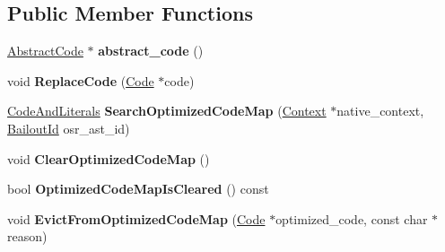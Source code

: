 \subsection*{Public Member Functions}
\begin{DoxyCompactItemize}
\item 
\hyperlink{classv8_1_1internal_1_1_abstract_code}{Abstract\+Code} $\ast$ {\bfseries abstract\+\_\+code} ()\hypertarget{classv8_1_1internal_1_1_shared_function_info_a795992850941caac037a2a79b6725e74}{}\label{classv8_1_1internal_1_1_shared_function_info_a795992850941caac037a2a79b6725e74}

\item 
void {\bfseries Replace\+Code} (\hyperlink{classv8_1_1internal_1_1_code}{Code} $\ast$code)\hypertarget{classv8_1_1internal_1_1_shared_function_info_aabebd159b454298b0c39320cf24c13ff}{}\label{classv8_1_1internal_1_1_shared_function_info_aabebd159b454298b0c39320cf24c13ff}

\item 
\hyperlink{structv8_1_1internal_1_1_code_and_literals}{Code\+And\+Literals} {\bfseries Search\+Optimized\+Code\+Map} (\hyperlink{classv8_1_1internal_1_1_context}{Context} $\ast$native\+\_\+context, \hyperlink{classv8_1_1internal_1_1_bailout_id}{Bailout\+Id} osr\+\_\+ast\+\_\+id)\hypertarget{classv8_1_1internal_1_1_shared_function_info_ac9d57a16aca72f42051fd6ec5205c04a}{}\label{classv8_1_1internal_1_1_shared_function_info_ac9d57a16aca72f42051fd6ec5205c04a}

\item 
void {\bfseries Clear\+Optimized\+Code\+Map} ()\hypertarget{classv8_1_1internal_1_1_shared_function_info_ad5fadaa94b7cf7af93630aeca427ba35}{}\label{classv8_1_1internal_1_1_shared_function_info_ad5fadaa94b7cf7af93630aeca427ba35}

\item 
bool {\bfseries Optimized\+Code\+Map\+Is\+Cleared} () const \hypertarget{classv8_1_1internal_1_1_shared_function_info_aa92d47539e7929cbf86456b1b1886117}{}\label{classv8_1_1internal_1_1_shared_function_info_aa92d47539e7929cbf86456b1b1886117}

\item 
void {\bfseries Evict\+From\+Optimized\+Code\+Map} (\hyperlink{classv8_1_1internal_1_1_code}{Code} $\ast$optimized\+\_\+code, const char $\ast$reason)\hypertarget{classv8_1_1internal_1_1_shared_function_info_ad6732306115e604cfbec5714cb6ec334}{}\label{classv8_1_1internal_1_1_shared_function_info_ad6732306115e604cfbec5714cb6ec334}


\end{DoxyCompactItemize}
